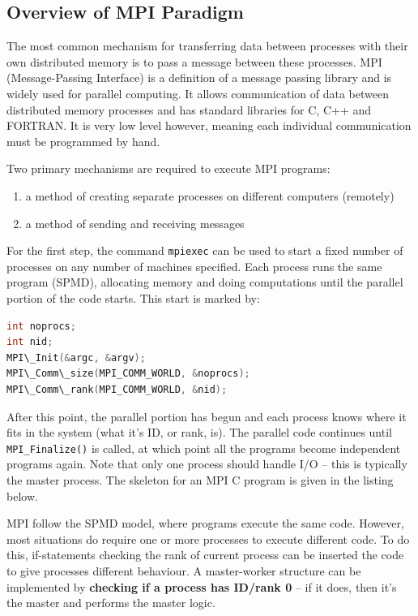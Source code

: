 \documentclass{article}
\begin{document}
\subsection{Overview of MPI Paradigm}

The most common mechanism for transferring data between processes with their own distributed memory is to pass a message between these processes. MPI (Message-Passing Interface) is a definition of a message passing library and is widely used for parallel computing. It allows communication of data between distributed memory processes and has standard libraries for C, C++ and FORTRAN. It is very low level however, meaning each individual communication must be programmed by hand.

Two primary mechanisms are required to execute MPI programs:
\begin{enumerate}
	\item a method of creating separate processes on different computers (remotely)
	\item a method of sending and receiving messages
\end{enumerate}
For the first step, the command \texttt{mpiexec} can be used to start a fixed number of processes on any number of machines specified. Each process runs the same program (SPMD), allocating memory and doing computations until the parallel portion of the code starts. This start is marked by:
\begin{lstlisting}[language=C,frame=single]
int noprocs;
int nid;
MPI\_Init(&argc, &argv);
MPI\_Comm\_size(MPI_COMM_WORLD, &noprocs);
MPI\_Comm\_rank(MPI_COMM_WORLD, &nid);
\end{lstlisting}

After this point, the parallel portion has begun and each process knows where it fits in the system (what it's ID, or rank, is). The parallel code continues until \texttt{MPI\_Finalize()} is called, at which point all the programs become independent programs again. Note that only one process should handle I/O -- this is typically the master process. The skeleton for an MPI C program is given in the listing below.

MPI follow the SPMD model, where programs execute the same code. However, most situations do require one or more processes to execute different code. To do this, if-statements checking the rank of current process can be inserted the code to give processes different behaviour. A master-worker structure can be implemented by \textbf{checking if a process has ID/rank 0} -- if it does, then it's the master and performs the master logic.
\end{document}
